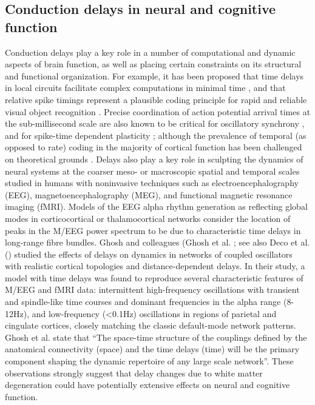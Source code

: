 
\subsection{Conduction delays in neural and cognitive function}

Conduction delays play a key role in a number of computational and dynamic aspects of brain function, as well as placing certain constraints on its structural and functional organization. For example, it has been proposed that time delays in local circuits facilitate complex computations in minimal time \citep{izhikevich2006polychronization}, and that relative spike timings represent a plausible coding principle for rapid and reliable visual object recognition \citep{vanrullen2002surfing}. Precise coordination of action potential arrival times at the sub-millisecond scale are also known to be critical for oscillatory synchrony \citep{fries2005a}, and for spike-time dependent plasticity 
\citep{markram1997regulation, zhang1998a}; although the prevalence of temporal (as opposed to rate) coding in the majority of cortical function has been challenged on theoretical grounds \citep{shadlen1998the}. Delays also play a key role in sculpting the dynamics of neural systems at the coarser meso- or macroscopic spatial and temporal scales studied in humans with noninvasive techniques such as electroencephalography (EEG), magnetoencephalography (MEG), and functional magnetic resonance imaging (fMRI). Models of the EEG alpha rhythm generation as reflecting global modes in corticocortical \citep{nunez2006electric}  or thalamocortical \citep{robinson2003neurophysical} networks consider the location of peaks in the M/EEG power spectrum to be due to characteristic time delays in long-range fibre bundles. Ghosh and colleagues (Ghosh et al. \citeyear{ghosh2008noise}; see also Deco et al. (\citeyear{deco2009key}) studied the effects of delays on dynamics in networks of coupled oscillators with realistic cortical topologies and distance-dependent delays. In their study, a model with time delays was found to reproduce several characteristic features of M/EEG and fMRI data: intermittent high-frequency oscillations with transient and spindle-like time courses and dominant frequencies in the alpha range (8-12Hz), and low-frequency (<0.1Hz) oscillations in regions of parietal and cingulate cortices, closely matching the classic default-mode network patterns.  Ghosh et al. state that “The space-time structure of the couplings defined by the anatomical connectivity (space) and the time delays (time) will be the primary component shaping
the dynamic repertoire of any large scale network”. These observations strongly suggest that delay changes due to white matter degeneration could have potentially extensive effects on neural and cognitive function. 

